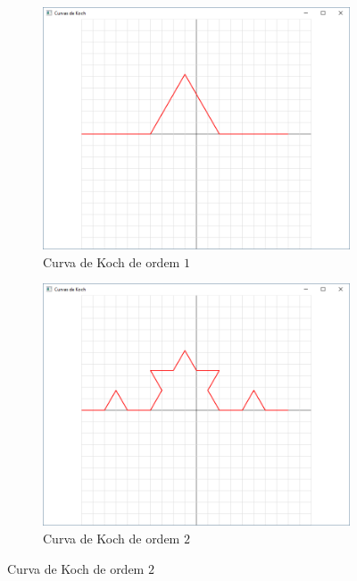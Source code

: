 \begin{enumerate}
\begin{enumerate}
        \label{ex:cap04_ex3a}

          \begin{figure}[!htp]
          \centering
          \begin{subfigure}[b]{0.4\textwidth}
              \centerline{\includegraphics[width=.9\textwidth]{img/cap4_ex14}}
              \caption{Curva de Koch de ordem $1$}
              \label{fig:cap03_ex14a}
          \end{subfigure}
          \hfill
          \begin{subfigure}[b]{0.4\textwidth}
              \centerline{\includegraphics[width=.9\textwidth]{img/cap4_ex14b}}
              \caption{Curva de Koch de ordem $2$}
              \label{fig:cap03_ex14b}
          \end{subfigure}
          \hfill

\end{figure}
\end{enumerate}
\end{enumerate}

